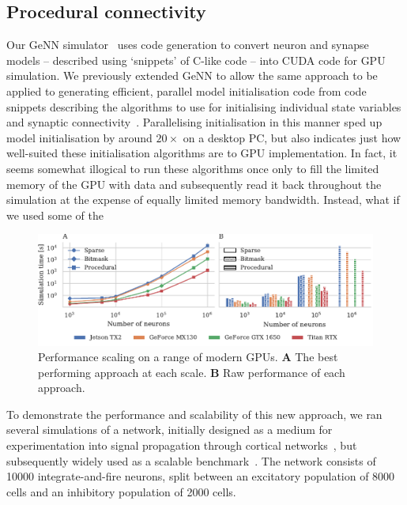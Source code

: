 \documentclass[9pt,twocolumn,twoside,lineno]{pnas-new}
\begin{document}
\subsection*{Procedural connectivity}
Our GeNN simulator~\citep{Yavuz2016} uses code generation to convert neuron and synapse models -- described using `snippets' of C-like code -- into CUDA code for GPU simulation.
We previously extended GeNN to allow the same approach to be applied to generating efficient, parallel model initialisation code from code snippets describing the algorithms to use for initialising individual state variables and synaptic connectivity~\citep{Knight2018}.
Parallelising initialisation in this manner sped up model initialisation by around $20\times$ on a desktop PC, but also indicates just how well-suited these initialisation algorithms are to GPU implementation.
In fact, it seems somewhat illogical to run these algorithms once only to fill the limited memory of the GPU with data and subsequently read it back throughout the simulation at the expense of equally limited memory bandwidth.
Instead, what if we used some of the 

\begin{figure}
    \centering
    \includegraphics{figures/performance_scaling}
    \caption{Performance scaling on a range of modern GPUs. \textbf{A} The best performing approach at each scale.
    \textbf{B} Raw performance of each approach.}
    \label{fig:performance_scaling}
\end{figure}

To demonstrate the performance and scalability of this new approach, we ran several simulations of a network, initially designed as a medium for experimentation into signal propagation through cortical networks~\citep{Vogels2005}, but subsequently  widely used as a scalable benchmark~\citep{Brette2007}.
The network consists of \num{10000} integrate-and-fire neurons, split between an excitatory population of \num{8000} cells and an inhibitory population of \num{2000} cells.
\end{document}
